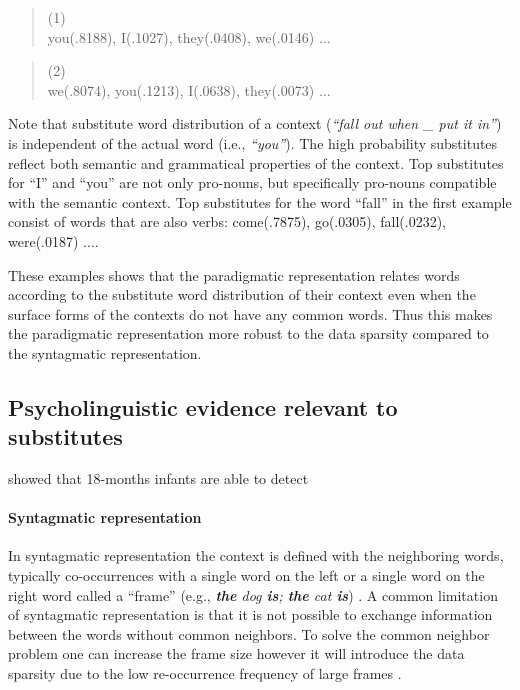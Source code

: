 \begin{quote}
  \small
  (1) \\
   you(.8188), I(.1027), they(.0408), we(.0146) $\ldots$
\end{quote}

\begin{quote}
  \small
  (2) \\
   we(.8074), you(.1213), I(.0638), they(.0073) $\ldots$
\end{quote}

Note that substitute word distribution of a context ({\it ``fall out when \_
put it in''}) is independent of the actual word (i.e., {\it ``you''}).  The
high probability substitutes reflect both semantic and grammatical properties
of the context.  Top substitutes for ``I'' and ``you'' are not only pro-nouns,
but specifically pro-nouns compatible with the semantic context.  Top
substitutes for the word ``fall'' in the first example consist of words that
are also verbs: come(.7875), go(.0305), fall(.0232), were(.0187) $\ldots$.

These examples shows that the paradigmatic representation relates words according
to the substitute word distribution of their context even when the surface
forms of the contexts do not have any common words.  Thus this makes the
paradigmatic representation more robust to the data sparsity compared to the
syntagmatic representation.

\subsection{Psycholinguistic evidence relevant to substitutes}

\cite{gomez2002variability} showed that 18-months infants are able to detect 

\paragraph {Syntagmatic representation} 
In syntagmatic representation the context is defined with the neighboring
words, typically co-occurrences with a single word on the left or a single word
on the right word called a ``frame'' (e.g., {\em {\bf the} dog {\bf is}; {\bf
the} cat {\bf is}})
\citep*{SchutzePe93,Redington98distributionalinformation, Mintz200391,clair2010,lamar-EtAl:2010:Short,maron2010sphere}. A common limitation of syntagmatic representation is that
it is not possible to exchange information between the words without common
neighbors.  To solve the common neighbor problem one can increase the frame
size however it will introduce the data sparsity due to the low re-occurrence
frequency of large frames \citep*{manning99foundations}.


